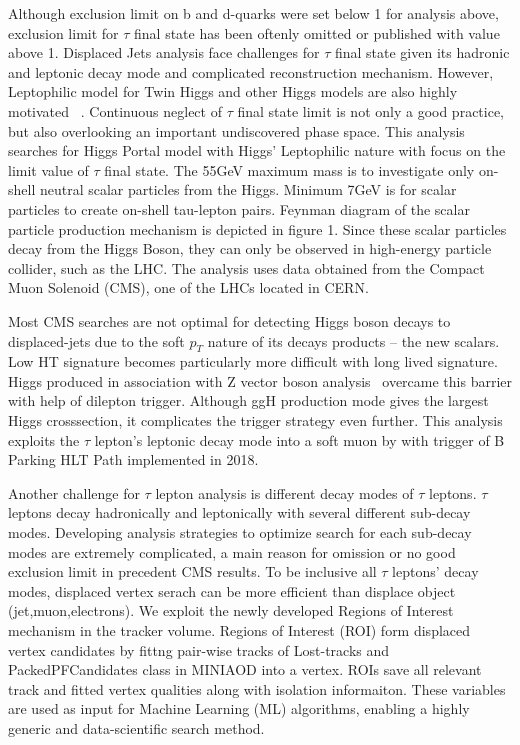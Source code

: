 Although exclusion limit on b and d-quarks were set below 1 for analysis above, exclusion limit for $\tau$ final state has been oftenly omitted or published with value above 1.  
Displaced Jets analysis face challenges for $\tau$ final state given its hadronic and leptonic decay mode and complicated reconstruction mechanism. 
However, Leptophilic model for Twin Higgs and other Higgs models are also highly motivated ~\cite{Lepto}. Continuous neglect of $\tau$ final state limit is not only a good practice, but also overlooking an important undiscovered phase space. 
This analysis searches for Higgs Portal model with Higgs' Leptophilic nature with focus on the limit value of $\tau$ final state.
The 55GeV maximum mass is to investigate only on-shell neutral scalar particles from the Higgs. 
Minimum 7GeV is for scalar particles to create on-shell tau-lepton pairs.
Feynman diagram of the scalar particle production mechanism is depicted in figure 1.
Since these scalar particles decay from the Higgs Boson, they can only be observed in high-energy particle collider, such as the LHC. 
The analysis uses data obtained from the Compact Muon Solenoid (CMS), one of the LHCs located in CERN. 

Most CMS searches are not optimal for detecting Higgs boson decays to displaced-jets
due to the soft $p_T$ nature of its decays products -- the new scalars.
Low HT signature becomes particularly more difficult with long lived signature.
Higgs produced in association with Z vector boson analysis~\cite{ZHAN} overcame this barrier with help of dilepton trigger. 
Although ggH production mode gives the largest Higgs crosssection, it complicates the trigger strategy even further. 
This analysis exploits the $\tau$ lepton's leptonic decay mode into a soft muon by with trigger of B Parking HLT Path implemented in 2018.

Another challenge for $\tau$ lepton analysis is different decay modes of $\tau$ leptons. 
$\tau$ leptons decay hadronically and leptonically with several different sub-decay modes. 
Developing analysis strategies to optimize search for each sub-decay modes are extremely complicated, a main reason for omission or no good exclusion limit in precedent CMS results.
To be inclusive all $\tau$ leptons' decay modes, displaced vertex serach can be more efficient than displace object (jet,muon,electrons). 
We exploit the newly developed Regions of Interest mechanism in the tracker volume. 
Regions of Interest (ROI) form displaced vertex candidates by fittng pair-wise tracks of Lost-tracks and PackedPFCandidates class in MINIAOD into a vertex. 
ROIs save all relevant track and fitted vertex qualities along with isolation informaiton.
These variables are used as input for Machine Learning (ML) algorithms, enabling a highly generic and data-scientific search method.


